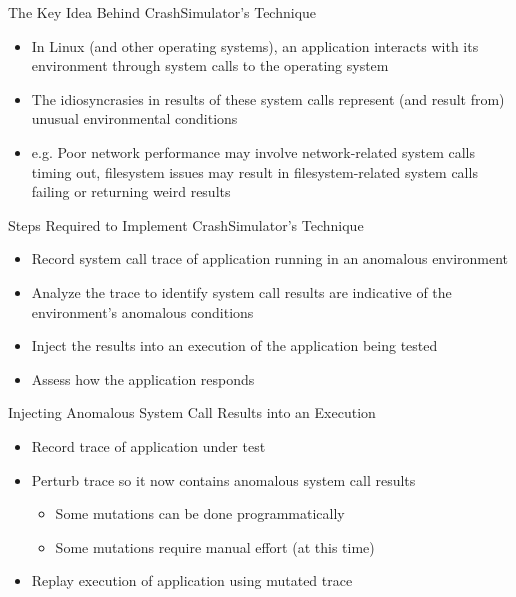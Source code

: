 \documentclass[pdf]{beamer}
\begin{document}
\begin{frame}{The Key Idea Behind CrashSimulator's Technique}
  \begin{itemize}
  \item{In Linux (and other operating systems), an application interacts with its environment
      through system calls to the operating system}
  \item{The idiosyncrasies in results of these system calls represent (and
      result from) unusual environmental conditions}
  \item{e.g. Poor network performance may involve network-related system
      calls timing out, filesystem issues may result in filesystem-related system
      calls failing or returning weird results}
  \end{itemize}
\end{frame}


\begin{frame}{Steps Required to Implement CrashSimulator's Technique}
  \begin{itemize}
  \item{Record system call trace of application running in an anomalous
      environment}
  \item{Analyze the trace to identify system call results are
      indicative of the environment's anomalous conditions}
  \item{Inject the results into an execution of the application being tested}
  \item{Assess how the application responds}
  \end{itemize}
\end{frame}


\begin{frame}{Injecting Anomalous System Call Results into an Execution}
  \begin{itemize}
  \item{Record trace of application under test}
  \item{Perturb trace so it now contains anomalous system call results}
    \begin{itemize}
    \item{Some mutations can be done programmatically}
    \item{Some mutations require manual effort (at this time)}
    \end{itemize}
  \item{Replay execution of application using mutated trace}
  \end{itemize}
\end{frame}
\end{document}
